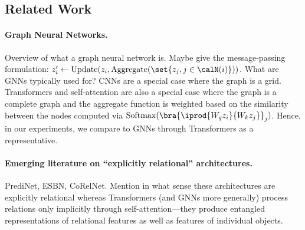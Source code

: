 \subsection{Related Work}


\paragraph{Graph Neural Networks.} Overview of what a graph neural network is. Maybe give the message-passing formulation: $z_i' \gets \mathrm{Update}(z_i, \mathrm{Aggregate}(\set{z_j, j \in \calN(i)}))$. What are GNNs typically used for? CNNs are a special case where the graph is a grid. Transformers and self-attention are also a special case where the graph is a complete graph and the aggregate function is weighted based on the similarity between the nodes computed via $\mathrm{Softmax}(\bra{\iprod{W_q z_i}{W_k z_j}}_j)$. Hence, in our experiments, we compare to GNNs through Transformers as a representative.

\paragraph{Emerging literature on ``explicitly relational'' architectures.} PrediNet, ESBN, CoRelNet. Mention in what sense these architectures are explicitly relational whereas Transformers (and GNNs more generally) process relations only implicitly through self-attention---they produce entangled representations of relational features as well as features of individual objects.